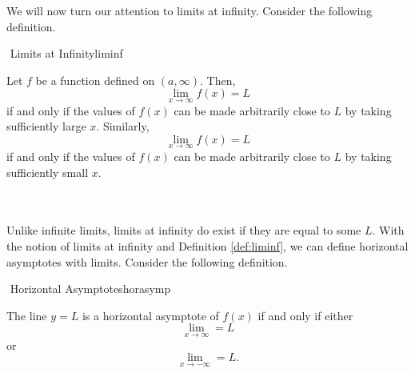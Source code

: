         We will now turn our attention to limits at infinity. Consider the following definition.
        \begin{definition}{\Stop\,\,Limits at Infinity}{liminf}

            Let \(f\) be a function defined on \((a,\infty)\). Then,
            \begin{equation*}
                \lim_{x\to\infty}f(x)=L
            \end{equation*}
            if and only if the values of \(f(x)\) can be made arbitrarily close to \(L\) by taking sufficiently large \(x\). Similarly,
            \begin{equation*}
                \lim_{x\to\infty}f(x)=L
            \end{equation*}
            if and only if the values of \(f(x)\) can be made arbitrarily close to \(L\) by taking sufficiently small \(x\).

        \end{definition}
        \pagebreak
        \vphantom
        \\
        \\
        Unlike infinite limits, limits at infinity do exist if they are equal to some \(L\). With the notion of limits at infinity and Definition \ref{def:liminf}, we can define horizontal asymptotes with limits. Consider the following definition.
        \begin{definition}{\Stop\,\,Horizontal Asymptotes}{horasymp}

            The line \(y=L\) is a horizontal asymptote of \(f(x)\) if and only if either
            \begin{equation*}
                \lim_{x\to\infty}=L
            \end{equation*}
            or
            \begin{equation*}
                \lim_{x\to-\infty}=L.
            \end{equation*}
            
        \end{definition}
